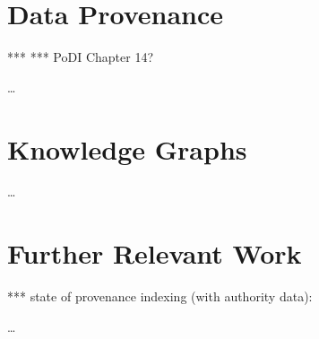 \section{Data Provenance}
\label{sec:data_provenance}

*** \autocite{Eckert2012}
*** PoDI Chapter 14?

\dots


\section{Knowledge Graphs}
\label{sec:KGs}

\dots


\section{Further Relevant Work}
\label{sec:further}


*** state of provenance indexing (with authority data): \autocite{Hakelberg2016}


\dots

